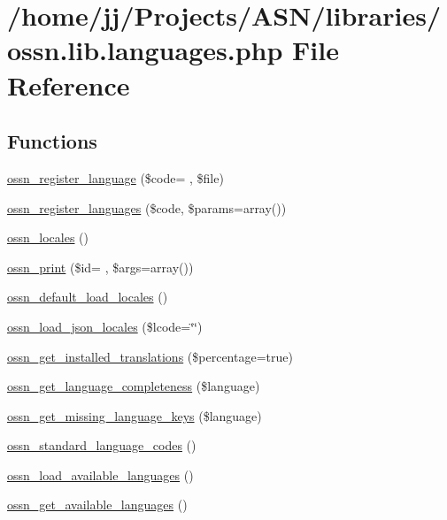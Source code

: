 \hypertarget{ossn_8lib_8languages_8php}{}\section{/home/jj/\+Projects/\+A\+S\+N/libraries/ossn.lib.\+languages.\+php File Reference}
\label{ossn_8lib_8languages_8php}
\subsection*{Functions}
\begin{DoxyCompactItemize}
\item 
\hyperlink{ossn_8lib_8languages_8php_a771c65906fc1b9fca3bd621d161e4dfd}{ossn\+\_\+register\+\_\+language} (\$code= \textquotesingle{}\textquotesingle{}, \$file)
\item 
\hyperlink{ossn_8lib_8languages_8php_a9b2c48a44b716a232b578c66629cff11}{ossn\+\_\+register\+\_\+languages} (\$code, \$params=array())
\item 
\hyperlink{ossn_8lib_8languages_8php_a7d8bbac0ecba41e1845d333c626da187}{ossn\+\_\+locales} ()
\item 
\hyperlink{ossn_8lib_8languages_8php_a2be5d1c4b695593a9b9067b96df2150a}{ossn\+\_\+print} (\$id= \textquotesingle{}\textquotesingle{}, \$args=array())
\item 
\hyperlink{ossn_8lib_8languages_8php_a4385959c578bfa324055c7f241757f8a}{ossn\+\_\+default\+\_\+load\+\_\+locales} ()
\item 
\hyperlink{ossn_8lib_8languages_8php_a925b41c354c21b6419ef43ec8a0d92cb}{ossn\+\_\+load\+\_\+json\+\_\+locales} (\$lcode=\char`\"{}\char`\"{})
\item 
\hyperlink{ossn_8lib_8languages_8php_abe7c17fb8d8dc01c326fb0f86bf1deea}{ossn\+\_\+get\+\_\+installed\+\_\+translations} (\$percentage=true)
\item 
\hyperlink{ossn_8lib_8languages_8php_aa0f7cfce368f7ee99af3176e6ad5b684}{ossn\+\_\+get\+\_\+language\+\_\+completeness} (\$language)
\item 
\hyperlink{ossn_8lib_8languages_8php_a5203ac909da6816a7b6a7f4381a18540}{ossn\+\_\+get\+\_\+missing\+\_\+language\+\_\+keys} (\$language)
\item 
\hyperlink{ossn_8lib_8languages_8php_a939b880ed3166dd7190fc0e047157a8d}{ossn\+\_\+standard\+\_\+language\+\_\+codes} ()
\item 
\hyperlink{ossn_8lib_8languages_8php_a478384e8a009be1081ef26908d5d3d00}{ossn\+\_\+load\+\_\+available\+\_\+languages} ()
\item 
\hyperlink{ossn_8lib_8languages_8php_aacfdf2defbdd672a72a05af06772d97b}{ossn\+\_\+get\+\_\+available\+\_\+languages} ()
\end{DoxyCompactItemize}


